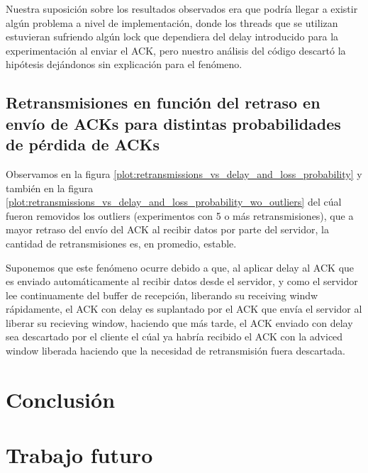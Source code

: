 \documentclass[a4paper, 10pt, twoside]{article}
\begin{document}
Nuestra suposición sobre los resultados observados era que podría llegar a existir algún problema a nivel de implementación, donde los threads que se utilizan estuvieran sufriendo algún lock que dependiera del delay introducido para la experimentación al enviar el ACK, pero nuestro análisis del código descartó la hipótesis dejándonos sin explicación para el fenómeno.


\subsection{Retransmisiones en función del retraso en envío de ACKs para distintas probabilidades de pérdida de ACKs} \label{sec:retr_vs_delay_and_loss}

Observamos en la figura \ref{plot:retransmissions_vs_delay_and_loss_probability} y también en la figura \ref{plot:retransmissions_vs_delay_and_loss_probability_wo_outliers} del cúal fueron removidos los outliers (experimentos con 5 o más retransmisiones), que a mayor retraso del envío del ACK al recibir datos por parte del servidor, la cantidad de retransmisiones es, en promedio, estable.

Suponemos que este fenómeno ocurre debido a que, al aplicar delay al ACK que es enviado automáticamente al recibir datos desde el servidor, y como el servidor lee continuamente del buffer de recepción, liberando su receiving windw rápidamente, el ACK con delay es suplantado por el ACK que envía el servidor al liberar su recieving window, haciendo que más tarde, el ACK enviado con delay sea descartado por el cliente el cúal ya habría recibido el ACK con la adviced window liberada haciendo que la necesidad de retransmisión fuera descartada.



\section{Conclusión}






\section{Trabajo futuro}




\begin{thebibliography}{9}


\end{thebibliography}
\end{document}
